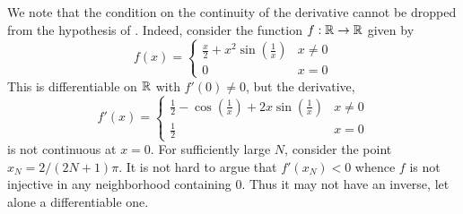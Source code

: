 We note that the condition on the continuity of the derivative cannot be dropped from the hypothesis of . Indeed, consider the function $f:\mathbb{R}\to\mathbb{R}$ given by 
\begin{equation*}
    f(x) = 
    \begin{cases}
        \frac{x}{2} + x^2\sin\left(\frac{1}{x}\right) & x \ne 0\\
        0 & x = 0
    \end{cases}
\end{equation*}
This is differentiable on $\mathbb{R}$ with $f'(0)\ne 0$, but the derivative, 
\begin{equation*}
    f'(x) = 
    \begin{cases}
        \frac{1}{2} - \cos\left(\frac{1}{x}\right) + 2x\sin\left(\frac{1}{x}\right) & x\ne 0\\
        \frac{1}{2} & x = 0
    \end{cases}
\end{equation*}
is not continuous at $x = 0$. For sufficiently large $N$, consider the point $x_N = 2/(2N + 1)\pi$. It is not hard to argue that $f'(x_N) < 0$ whence $f$ is not injective in any neighborhood containing $0$. Thus it may not have an inverse, let alone a differentiable one.

\begin{theorem}
\end{theorem}
